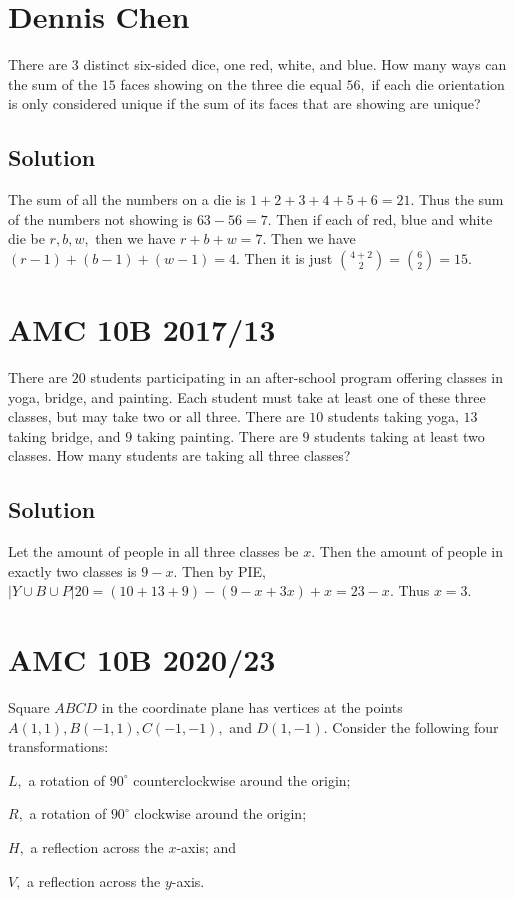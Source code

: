 \documentclass{article}
\begin{document}
\pagebreak\section{Dennis Chen}
There are $3$ distinct six-sided dice, one red, white, and blue. How many ways can the sum of the $15$ faces showing on the three die equal $56,$ if each die orientation is only considered unique if the sum of its faces that are showing are unique?

\subsection{Solution}
The sum of all the numbers on a die is $1+2+3+4+5+6=21.$ Thus the sum of the numbers not showing is $63-56=7.$ Then if each of red, blue and white die be $r, b, w,$ then we have $r+b+w=7.$ Then we have $(r-1)+(b-1)+(w-1)=4$. Then it is just $\binom{4+2}{2} = \binom{6}{2} = 15.$  

\pagebreak\section{AMC 10B 2017/13}
There are $20$ students participating in an after-school program offering classes in yoga, bridge, and painting. Each student must take at least one of these three classes, but may take two or all three. There are $10$ students taking yoga, $13$ taking bridge, and $9$ taking painting. There are $9$ students taking at least two classes. How many students are taking all three classes?

\subsection{Solution}
Let the amount of people in all three classes be $x.$ Then the amount of people in exactly two classes is $9-x.$ Then by PIE, $|Y\cup B\cup P|20=(10+13+9)-(9-x+3x)+x=23-x.$ Thus $x=3.$

\pagebreak\section{AMC 10B 2020/23}
Square $ABCD$ in the coordinate plane has vertices at the points $A(1,1), B(-1,1), C(-1,-1),$ and $D(1,-1).$ Consider the following four transformations:
    
\begin{itemize}
    \Item $L,$ a rotation of $90^{\circ}$ counterclockwise around the origin;

    \Item $R,$ a rotation of $90^{\circ}$ clockwise around the origin;
    
    \Item $H,$ a reflection across the $x$-axis; and

    \Item $V,$ a reflection across the $y$-axis.
\end{itemize}
\end{document}
